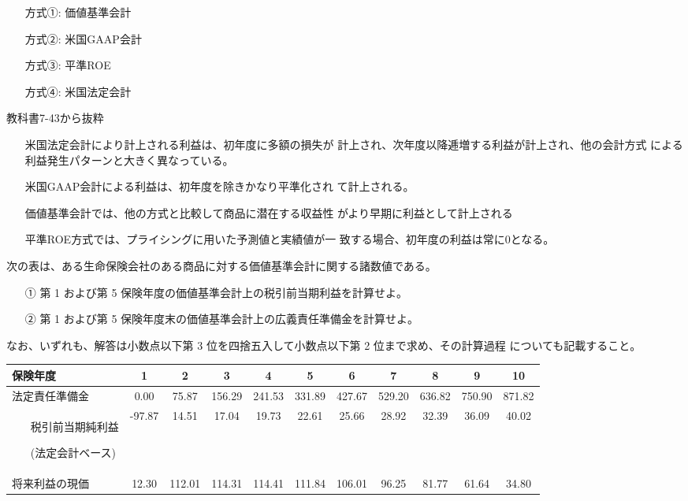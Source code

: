 \documentclass[report,gutter=10mm,fore-edge=10mm,uplatex,dvipdfmx]{jlreq}
\begin{document}
\begin{itemize}
\item[ 方式①: ] 価値基準会計
\item[ 方式②: ] 米国GAAP会計
\item[ 方式③: ] 平準ROE
\item[ 方式④: ] 米国法定会計
\end{itemize}

教科書7-43から抜粋

\begin{itemize}
\item[]
 米国法定会計により計上される利益は、初年度に多額の損失が
 計上され、次年度以降逓増する利益が計上され、他の会計方式
 による利益発生パターンと大きく異なっている。

\item[]
 米国GAAP会計による利益は、初年度を除きかなり平準化され
 て計上される。

\item[]
 価値基準会計では、他の方式と比較して商品に潜在する収益性
 がより早期に利益として計上される

\item[]
 平準ROE方式では、プライシングに用いた予測値と実績値が一
 致する場合、初年度の利益は常に0となる。
\end{itemize}

次の表は、ある生命保険会社のある商品に対する価値基準会計に関する諸数値である。
\begin{itemize}
\item[① ] 第 1 および第 5 保険年度の価値基準会計上の税引前当期利益を計算せよ。
\item[② ] 第 1 および第 5 保険年度末の価値基準会計上の広義責任準備金を計算せよ。
\end{itemize}
なお、いずれも、解答は小数点以下第 3 位を四捨五入して小数点以下第 2 位まで求め、その計算過程
についても記載すること。\vspace{1zh}

 \begin{tabular}{|p{}|c|c|c|c|c|c|c|c|c|c|}
  \hline
保険年度&1&2&3&4&5&6&7&8&9&10\\ \hline
法定責任準備金&0.00&75.87&156.29&241.53&331.89&427.67&529.20&636.82&750.90&871.82\\ \hline
\begin{itemize}
\item[]  税引前当期純利益
\item[]  (法定会計ベース)
\end{itemize}&
-97.87&14.51&17.04&19.73&22.61&25.66&28.92&32.39&36.09&40.02\\ \hline
将来利益の現価&12.30&112.01&114.31&114.41&111.84&106.01&96.25&81.77&61.64&34.80\\ \hline
 \end{tabular}
\vspace{1zh}
\end{document}
